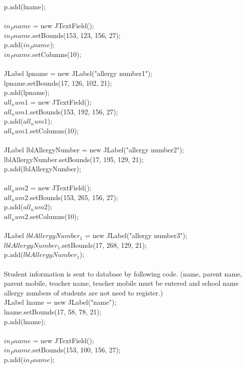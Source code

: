 \documentclass[a4paper,11pt]{IEEEtran}
\begin{document}
{{{{p.add(lname);\\
~\\
$in_Pname$ = new JTextField();\\
$in_Pname$.setBounds(153, 123, 156, 27);\\
p.add($in_Pname$);\\
$in_Pname$.setColumns(10);\\
~\\
JLabel lpname = new JLabel("allergy number1");\\
lpname.setBounds(17, 126, 102, 21);\\
p.add(lpname);
~\\
$all_num1$ = new JTextField();\\
$all_num1$.setBounds(153, 192, 156, 27);\\
p.add($all_num1$);\\
$all_num1$.setColumns(10);\\
~\\
JLabel lblAllergyNumber = new JLabel("allergy number2");\\
lblAllergyNumber.setBounds(17, 195, 129, 21);\\
p.add(lblAllergyNumber);\\
~\\
$all_num2$ = new JTextField();\\
$all_num2$.setBounds(153, 265, 156, 27);\\
p.add($all_num2$);\\
$all_num2$.setColumns(10);\\
~\\
JLabel $lblAllergyNumber_1$ = new JLabel("allergy number3");\\
$lblAllergyNumber_1$.setBounds(17, 268, 129, 21);\\
p.add($lblAllergyNumber_1$);\\
~\\
Student information is sent to database by following code. (name, parent name, parent mobile, teacher name, teacher mobile must be entered and school name allergy numbers of students are not need to register.)
~\\
JLabel lname = new JLabel("name");\\
lname.setBounds(17, 58, 78, 21);\\
p.add(lname);\\
~\\
$in_Pname$ = new JTextField();\\
$in_Pname$.setBounds(153, 100, 156, 27);\\
p.add($in_Pname$);\\
}}}}
\end{document}
